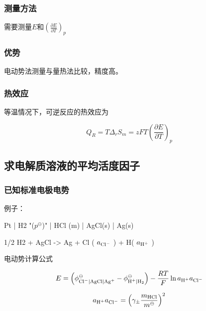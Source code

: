\subsubsection{测量方法}

需要测量$E$和$\left(  \frac{\partial E}{\partial T} \right)_p $

\subsubsection{优势}

电动势法测量与量热法比较，精度高。

\subsubsection{热效应}


等温情况下，可逆反应的热效应为

\begin{equation*}
    Q_R = T \Delta_r S_m = zFT \left(  \frac{\partial E}{\partial T} \right)_p
\end{equation*}

\subsection{求电解质溶液的平均活度因子}

\subsubsection{已知标准电极电势}

例子：

\begin{reaction*}
    Pt | H2 "($p^\ominus$)" | HCl (m) | AgCl(s) | Ag(s)
\end{reaction*}

\begin{reaction*}
    1/2 H2 + AgCl -> Ag + {Cl\mch} ( $a_{\ce{Cl-}}$ ) + H\pch ( $a_{\ce{H+}}$ )
\end{reaction*}


电动势计算公式

\begin{equation*}
    E = \left( \phi^\ominus_{\ce{Cl-} | \ce{AgCl} | \ce{Ag+}}   - \phi^\ominus_{\ce{H+} | \ce{H2}} \right)  - \frac{RT}{F} \ln a_{\ce{H+}} a_{\ce{Cl-}}
\end{equation*}

\begin{equation*}
    a_{\ce{H+}} a_{\ce{Cl-}}= \left(\gamma_\pm  \frac{m_{\ce{HCl} }}{m^\ominus} \right)^2
\end{equation*}

